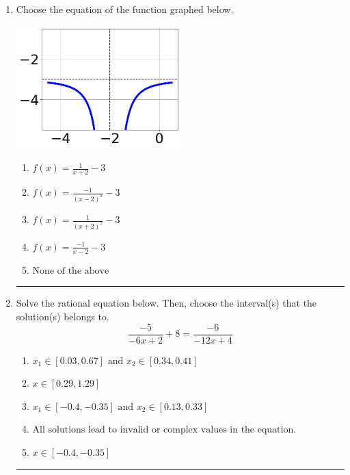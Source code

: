 \documentclass[14pt]{extbook}
\newcommand{\litem}[1]{\item#1\hspace*{-1cm}\rule{\textwidth}{0.4pt}}
\begin{document}
\begin{enumerate}
{\begin{enumerate}[label=\Alph*.]
\end{enumerate} }
\litem{
Choose the equation of the function graphed below.
\begin{center}
    \includegraphics[width=0.5\textwidth]{../Figures/rationalGraphToEquationCopyC.png}
\end{center}
\begin{enumerate}[label=\Alph*.]
\item \( f(x) = \frac{1}{x + 2} - 3 \)
\item \( f(x) = \frac{-1}{(x - 2)^2} - 3 \)
\item \( f(x) = \frac{1}{(x + 2)^2} - 3 \)
\item \( f(x) = \frac{-1}{x - 2} - 3 \)
\item \( \text{None of the above} \)

\end{enumerate} }
\litem{
Solve the rational equation below. Then, choose the interval(s) that the solution(s) belongs to.\[ \frac{-5}{-6x + 2} + 8 = \frac{-6}{-12x + 4} \]\begin{enumerate}[label=\Alph*.]
\item \( x_1 \in [0.03, 0.67] \text{ and } x_2 \in [0.34,0.41] \)
\item \( x \in [0.29,1.29] \)
\item \( x_1 \in [-0.4, -0.35] \text{ and } x_2 \in [0.13,0.33] \)
\item \( \text{All solutions lead to invalid or complex values in the equation.} \)
\item \( x \in [-0.4,-0.35] \)


\end{enumerate}}
\end{enumerate}
\end{document}

